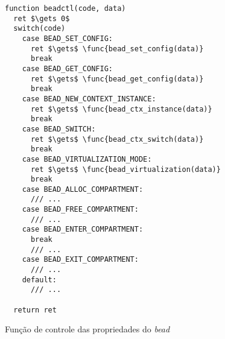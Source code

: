 \begin{pseudocode}

\begin{lstlisting}[language=pseudocode, style=pseudocode]
function beadctl(code, data)
  ret $\gets 0$
  switch(code)
    case BEAD_SET_CONFIG:
      ret $\gets$ \func{bead_set_config(data)}
      break
    case BEAD_GET_CONFIG:
      ret $\gets$ \func{bead_get_config(data)}
      break
    case BEAD_NEW_CONTEXT_INSTANCE:
      ret $\gets$ \func{bead_ctx_instance(data)}
      break
    case BEAD_SWITCH:
      ret $\gets$ \func{bead_ctx_switch(data)}
      break
    case BEAD_VIRTUALIZATION_MODE:
      ret $\gets$ \func{bead_virtualization(data)}
      break
    case BEAD_ALLOC_COMPARTMENT:
      /// ...
    case BEAD_FREE_COMPARTMENT:
      /// ...
    case BEAD_ENTER_COMPARTMENT:
      break
      /// ...
    case BEAD_EXIT_COMPARTMENT:
      /// ...
    default:
      /// ...

  return ret

\end{lstlisting}

  \caption{Função de controle das propriedades do \emph{bead}}
  \label{alg:ctlbead}
\end{pseudocode}
